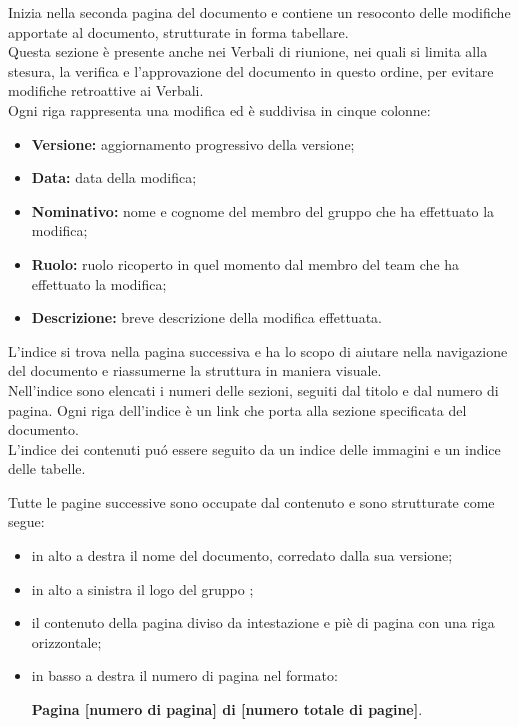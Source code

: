         Inizia nella seconda pagina del documento e contiene un resoconto delle modifiche apportate al documento, strutturate in forma tabellare.\\
        Questa sezione è presente anche nei Verbali di riunione, nei quali si limita alla stesura, la verifica e l'approvazione del documento in questo ordine, per evitare modifiche retroattive ai Verbali.\\
        Ogni riga rappresenta una modifica ed è suddivisa in cinque colonne:
        \begin{itemize}
          \item \textbf{Versione:} aggiornamento progressivo della versione;
          \item \textbf{Data:} data della modifica;
          \item \textbf{Nominativo:} nome e cognome del membro del gruppo che ha effettuato la modifica;
          \item \textbf{Ruolo:} ruolo ricoperto in quel momento dal membro del team che ha effettuato la modifica;
          \item \textbf{Descrizione:} breve descrizione della modifica effettuata.
        \end{itemize}

        L'indice si trova nella pagina successiva e ha lo scopo di aiutare nella navigazione del documento e riassumerne la struttura in maniera visuale.\\
        Nell'indice sono elencati i numeri delle sezioni, seguiti dal titolo e dal numero di pagina. Ogni riga dell'indice è un link che porta alla sezione specificata del documento.\\
        L'indice dei contenuti puó essere seguito da un indice delle immagini e un indice delle tabelle.

        Tutte le pagine successive sono occupate dal contenuto e sono strutturate come segue:
        \begin{itemize}
          \item in alto a destra il nome del documento, corredato dalla sua versione;
          \item in alto a sinistra il logo del gruppo \Gruppo{};
          \item il contenuto della pagina diviso da intestazione e piè di pagina con una riga orizzontale;
          \item in basso a destra il numero di pagina nel formato:
          \begin{center}
            \textbf{Pagina [numero di pagina] di [numero totale di pagine]}.
          \end{center}
        \end{itemize}


